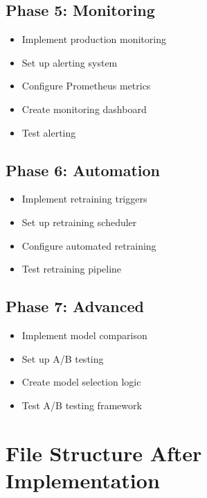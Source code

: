 \documentclass[12pt]{article}
\begin{document}
\subsection{Phase 5: Monitoring}
\begin{itemize}
    \item[ ] Implement production monitoring
    \item[ ] Set up alerting system
    \item[ ] Configure Prometheus metrics
    \item[ ] Create monitoring dashboard
    \item[ ] Test alerting
\end{itemize}

\subsection{Phase 6: Automation}
\begin{itemize}
    \item[ ] Implement retraining triggers
    \item[ ] Set up retraining scheduler
    \item[ ] Configure automated retraining
    \item[ ] Test retraining pipeline
\end{itemize}

\subsection{Phase 7: Advanced}
\begin{itemize}
    \item[ ] Implement model comparison
    \item[ ] Set up A/B testing
    \item[ ] Create model selection logic
    \item[ ] Test A/B testing framework
\end{itemize}

\section{File Structure After Implementation}
\end{document}
